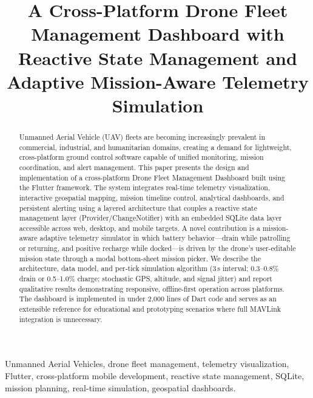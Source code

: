 \documentclass[conference]{IEEEtran}
\begin{document}
\title{A Cross-Platform Drone Fleet Management Dashboard with Reactive State Management and Adaptive Mission-Aware Telemetry Simulation}

\author{
}

\maketitle

\begin{abstract}
Unmanned Aerial Vehicle (UAV) fleets are becoming increasingly prevalent in commercial, industrial, and humanitarian domains, creating a demand for lightweight, cross-platform ground control software capable of unified monitoring, mission coordination, and alert management. This paper presents the design and implementation of a cross-platform Drone Fleet Management Dashboard built using the Flutter framework. The system integrates real-time telemetry visualization, interactive geospatial mapping, mission timeline control, analytical dashboards, and persistent alerting using a layered architecture that couples a reactive state management layer (Provider/ChangeNotifier) with an embedded SQLite data layer accessible across web, desktop, and mobile targets. A novel contribution is a mission-aware adaptive telemetry simulator in which battery behavior---drain while patrolling or returning, and positive recharge while docked---is driven by the drone's user-editable mission state through a modal bottom-sheet mission picker. We describe the architecture, data model, and per-tick simulation algorithm (3\,s interval; 0.3--0.8\% drain or 0.5--1.0\% charge; stochastic GPS, altitude, and signal jitter) and report qualitative results demonstrating responsive, offline-first operation across platforms. The dashboard is implemented in under 2{,}000 lines of Dart code and serves as an extensible reference for educational and prototyping scenarios where full MAVLink integration is unnecessary.
\end{abstract}

\begin{IEEEkeywords}
Unmanned Aerial Vehicles, drone fleet management, telemetry visualization, Flutter, cross-platform mobile development, reactive state management, SQLite, mission planning, real-time simulation, geospatial dashboards.
\end{IEEEkeywords}
\end{document}
